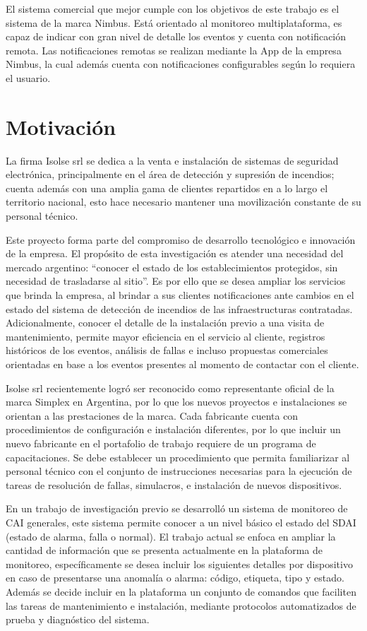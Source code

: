 El sistema comercial que mejor cumple con los objetivos de este trabajo es el sistema de la marca Nimbus. Está orientado al monitoreo multiplataforma, es capaz de indicar con gran nivel de detalle los eventos y cuenta con notificación remota. Las notificaciones remotas se realizan mediante la App de la empresa Nimbus, la cual además cuenta con notificaciones configurables según lo requiera el usuario.

\section{Motivación}
%
La firma Isolse srl se dedica a la venta e instalación de sistemas de seguridad electrónica, principalmente en el área de detección y supresión de incendios; cuenta además con una amplia gama de clientes repartidos en a lo largo el territorio nacional, esto hace necesario mantener una movilización constante de su personal técnico.

Este proyecto forma parte del compromiso de desarrollo tecnológico e innovación de la empresa. El propósito de esta investigación es atender una necesidad del mercado argentino: “conocer el estado de los establecimientos protegidos, sin necesidad de trasladarse al sitio”. Es por ello que se desea ampliar los servicios que brinda la empresa, al brindar a sus clientes notificaciones ante cambios en el estado del sistema de detección de incendios de las infraestructuras contratadas. Adicionalmente, conocer el detalle de la instalación previo a una visita de mantenimiento, permite mayor eficiencia en el servicio al cliente, registros históricos de los eventos, análisis de fallas  e incluso propuestas comerciales orientadas en base a los eventos presentes al momento de contactar con el cliente.

Isolse srl recientemente logró ser reconocido como representante oficial de la marca Simplex en Argentina, por lo que los nuevos proyectos e instalaciones se orientan a las prestaciones de la marca. Cada fabricante cuenta con procedimientos de configuración e instalación diferentes, por lo que incluir un nuevo fabricante en el portafolio de trabajo requiere de un programa de capacitaciones. Se debe establecer un procedimiento que permita familiarizar al personal técnico con el conjunto de instrucciones necesarias para la ejecución de tareas de resolución de fallas, simulacros, e instalación de nuevos dispositivos.  

En un trabajo de investigación previo se desarrolló un sistema de monitoreo de CAI generales, este sistema permite conocer a un nivel básico el estado del SDAI (estado de alarma, falla o normal). El trabajo actual se enfoca en ampliar la cantidad de información que se presenta actualmente en la plataforma de monitoreo, específicamente se desea incluir los siguientes detalles por dispositivo en caso de presentarse una anomalía o alarma: código, etiqueta, tipo y estado. Además se decide incluir en la plataforma un conjunto de comandos que faciliten las tareas de mantenimiento e instalación, mediante protocolos automatizados de prueba y diagnóstico del sistema. 
